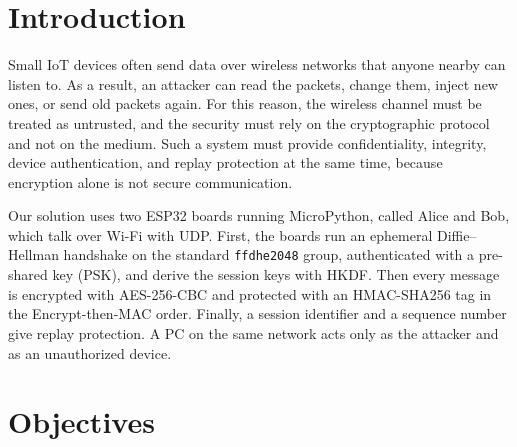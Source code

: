 \documentclass[11pt,a4paper]{article}
\begin{document}




\tableofcontents
\newpage


\setcounter{page}{1}


\section{Introduction}

Small IoT devices often send data over wireless networks that anyone nearby
can listen to. As a result, an attacker can read the packets, change them,
inject new ones, or send old packets again. For this reason, the wireless
channel must be treated as untrusted, and the security must rely on the
cryptographic protocol and not on the medium. Such a system must provide
confidentiality, integrity, device authentication, and replay protection at the
same time, because encryption alone is not secure communication.

Our solution uses two ESP32 boards running MicroPython, called Alice and Bob,
which talk over Wi-Fi with UDP. First, the boards run an ephemeral
Diffie--Hellman handshake on the standard \texttt{ffdhe2048} group,
authenticated with a pre-shared key (PSK), and derive the session keys with
HKDF. Then every message is encrypted with AES-256-CBC and protected with an
HMAC-SHA256 tag in the Encrypt-then-MAC order. Finally, a session identifier
and a sequence number give replay protection. A PC on the same network acts
only as the attacker and as an unauthorized device.


\section{Objectives}
\end{document}
